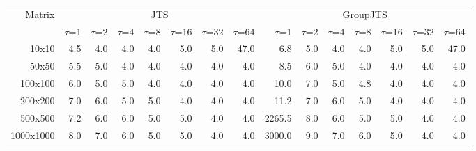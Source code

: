 \begin{tabular}{rrrrrrrrrrrrrrr}
\toprule
Matrix & \multicolumn{7}{c}{JTS} & \multicolumn{7}{c}{GroupJTS} \\
\cmidrule(lr){2-8} \cmidrule(lr){9-15}
& $\tau$=1 & $\tau$=2 & $\tau$=4 & $\tau$=8 & $\tau$=16 & $\tau$=32 & $\tau$=64 & $\tau$=1 & $\tau$=2 & $\tau$=4 & $\tau$=8 & $\tau$=16 & $\tau$=32 & $\tau$=64 \\
\midrule
10x10 & 4.5 & 4.0 & 4.0 & 4.0 & 5.0 & 5.0 & 47.0 & 6.8 & 5.0 & 4.0 & 4.0 & 5.0 & 5.0 & 47.0 \\
50x50 & 5.5 & 5.0 & 4.0 & 4.0 & 4.0 & 4.0 & 4.0 & 8.5 & 6.0 & 5.0 & 4.0 & 4.0 & 4.0 & 4.0 \\
100x100 & 6.0 & 5.0 & 5.0 & 4.0 & 4.0 & 4.0 & 4.0 & 10.0 & 7.0 & 5.0 & 4.8 & 4.0 & 4.0 & 4.0 \\
200x200 & 7.0 & 6.0 & 5.0 & 5.0 & 4.0 & 4.0 & 4.0 & 11.2 & 7.0 & 6.0 & 5.0 & 4.0 & 4.0 & 4.0 \\
500x500 & 7.2 & 6.0 & 6.0 & 5.0 & 5.0 & 4.0 & 4.0 & 2265.5 & 8.0 & 6.0 & 5.0 & 5.0 & 4.0 & 4.0 \\
1000x1000 & 8.0 & 7.0 & 6.0 & 5.0 & 5.0 & 4.0 & 4.0 & 3000.0 & 9.0 & 7.0 & 6.0 & 5.0 & 4.0 & 4.0 \\
\bottomrule
\end{tabular}
